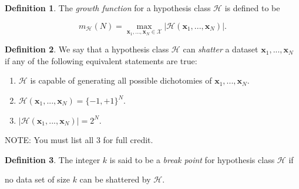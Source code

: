 \documentclass[10pt]{exam}
\theoremstyle{definition}
\newtheorem{defn}{Definition}
\newcommand{\x}{\mathbf x}
\begin{document}
\begin{defn}
    The \emph{growth function} for a hypothesis class $\mathcal H$ is defined to be
    \begin{solutionorbox}
    \begin{equation*}
        m_{\mathcal H}(N) = \max_{\x_1,...,\x_N\in\mathcal X} \big| \mathcal H(\x_1, ..., \x_N) \big|.
    \end{equation*}
    \end{solutionorbox}
\end{defn}

\begin{defn}
    We say that a hypothesis class $\mathcal H$ can \emph{shatter} a dataset $\x_1, ..., \x_N$ if any of the following equivalent statements are true:
    \begin{solutionorbox}
    \begin{enumerate}
        \item $\mathcal H$ is capable of generating all possible dichotomies of $\x_1, ..., \x_N$.
        \item $\mathcal H(\x_1, ..., \x_N) = \{-1, +1\}^N$.
        \item $\left|\mathcal H(\x_1, ..., \x_N)\right| = 2^N$.
    \end{enumerate}

        NOTE: You must list all 3 for full credit.
    \end{solutionorbox}
\end{defn}
\begin{defn}
The integer $k$ is said to be a \emph{break point} for hypothesis class $\mathcal H$ if
    \begin{solutionorbox}
    no data set of size $k$ can be shattered by $\mathcal H$.
    \end{solutionorbox}
\end{defn}
\end{document}
